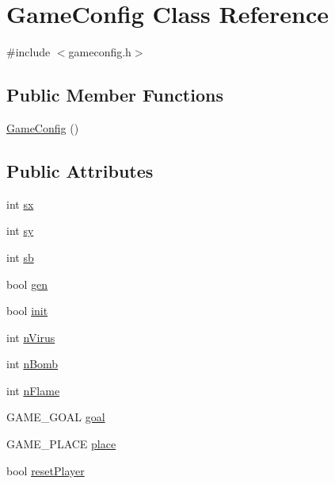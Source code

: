 \hypertarget{class_game_config}{\section{Game\-Config Class Reference}
\label{class_game_config}
}


{\ttfamily \#include $<$gameconfig.\-h$>$}

\subsection*{Public Member Functions}
\begin{DoxyCompactItemize}
\item 
\hyperlink{class_game_config_aa6c5ed14b29de260101212fafa6eea2e}{Game\-Config} ()
\end{DoxyCompactItemize}
\subsection*{Public Attributes}
\begin{DoxyCompactItemize}
\item 
int \hyperlink{class_game_config_a2d0ce90177998c391616135c23940926}{sx}
\item 
int \hyperlink{class_game_config_a3e7e2289445c44a3f717b5d669567ec0}{sy}
\item 
int \hyperlink{class_game_config_a948be02f34afe02e545363f1c676f988}{sb}
\item 
bool \hyperlink{class_game_config_aa90aa318b3fd01230547b1728920d53f}{gen}
\item 
bool \hyperlink{class_game_config_a0389cbafde3a55d7f6fb5ff288f911f3}{init}
\item 
int \hyperlink{class_game_config_aa497a44e022947c0a05d61f9ca6ea233}{n\-Virus}
\item 
int \hyperlink{class_game_config_a6b48f50aed695811e24b0d808ba12940}{n\-Bomb}
\item 
int \hyperlink{class_game_config_a4e1eb0b2c04ceb1523ce940dfdd3e718}{n\-Flame}
\item 
G\-A\-M\-E\-\_\-\-G\-O\-A\-L \hyperlink{class_game_config_a1d62215e22afec4de042262a8ac34265}{goal}
\item 
G\-A\-M\-E\-\_\-\-P\-L\-A\-C\-E \hyperlink{class_game_config_a86bebdbe2a5f4493d0b792c09fe770c6}{place}
\item 
bool \hyperlink{class_game_config_a0d57ca4b0ff19ea78d3464164608d3dd}{reset\-Player}
\end{DoxyCompactItemize}



